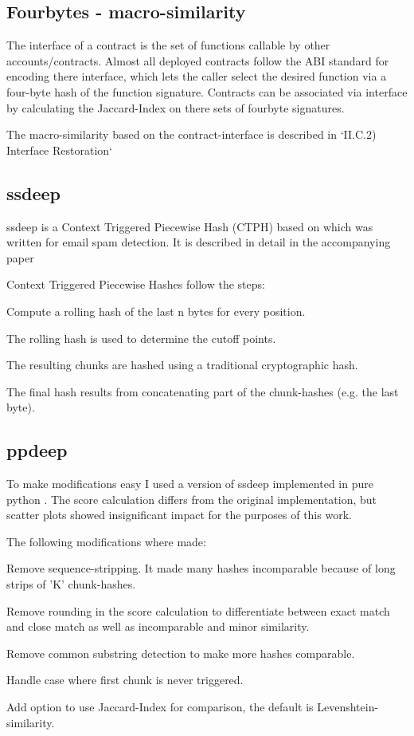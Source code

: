 \documentclass[../main.tex]{subfiles}
\begin{document}
\subsection{Fourbytes - macro-similarity}

The interface of a contract is the set of functions callable by other accounts/contracts.
Almost all deployed contracts follow the ABI standard for encoding there interface, which lets the caller select the desired function via a four-byte hash of the function signature.
Contracts can be associated via interface by calculating the Jaccard-Index on there sets of fourbyte signatures.

The macro-similarity based on the contract-interface is described in `II.C.2) Interface Restoration` 

\subsection{ssdeep}
ssdeep is a Context Triggered Piecewise Hash (CTPH) based on  which was written for email spam detection. It is described in detail in the accompanying paper 

Context Triggered Piecewise Hashes follow the steps:
\begin{ol}
  \item Compute a rolling hash of the last n bytes for every position.
  \item The rolling hash is used to determine the cutoff points.
  \item The resulting chunks are hashed using a traditional cryptographic hash.
  \item The final hash results from concatenating part of the chunk-hashes (e.g. the last byte).
\end{ol}

\subsection{ppdeep}
To make modifications easy I used a version of ssdeep implemented in pure python . The score calculation differs from the original implementation, but scatter plots showed insignificant impact for the purposes of this work.

The following modifications where made:
\begin{ul}
  \item Remove sequence-stripping. It made many hashes incomparable because of long strips of 'K' chunk-hashes.
  \item Remove rounding in the score calculation to differentiate between exact match and close match as well as incomparable and minor similarity.
  \item Remove common substring detection to make more hashes comparable.
  \item Handle case where first chunk is never triggered.
  \item Add option to use Jaccard-Index for comparison, the default is Levenshtein-similarity.
\end{ul}
\end{document}
